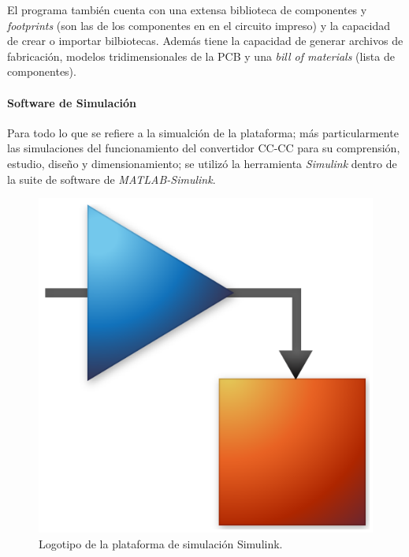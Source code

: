 El programa también cuenta con una extensa biblioteca de componentes y \textit{footprints} (son las  de los componentes en en el circuito impreso) y la capacidad de crear o importar bilbiotecas. Además tiene la capacidad de generar archivos de fabricación, modelos tridimensionales de la PCB y una \textit{bill of materials} (lista de componentes).\\

\paragraph{Software de Simulación}

Para todo lo que se refiere a la simualción de la plataforma; más particularmente las simulaciones del funcionamiento del convertidor CC-CC para su comprensión, estudio, diseño y dimensionamiento; se utilizó la herramienta {\Medium\textit{Simulink}} dentro de la suite de software de \textit{MATLAB-Simulink}.\\

\begin{figure}[h]
    \centering
    \includegraphics[scale=0.08]{Imagenes/Simulink.png}
    \caption{Logotipo de la plataforma de simulación Simulink.}
    \label{logo_simulink}
\end{figure}

